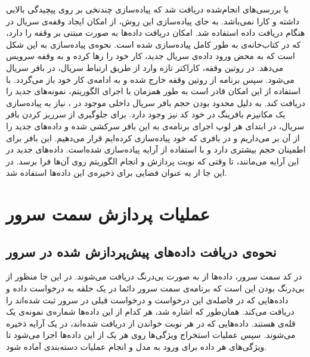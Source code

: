 با بررسی‌های انجام‌شده دریافت شد که پیاده‌سازی چندنخی بر روی  پیچیدگی بالایی داشته و کارا نمی‌باشد. به جای پیاده‌سازی این روش، از امکان ایجاد وقفه‌ی سریال در هنگام دریافت داده استفاده شد.  امکان دریافت داده‌ها به صورت مبتنی بر وقفه را دارد، که در کتاب‌خانه‌ی  به طور کامل پیاده‌سازی شده است. نحوه‌ی پیاده‌سازی به این شکل است که به محض ورود داده‌ی سریال جدید،  کار خود را رها کرده و به وقفه سرویس می‌دهد. در روتین وقفه، کاراکتر تازه وارد از طریق ارتباط سریال، در بافر سریال  می‌شود. سپس برنامه از روتین وقفه خارج شده و به ادامه‌ی کار خود باز می‌گردد. با استفاده از این امکان  قادر است به طور همزمان با اجرای الگوریتم، نمونه‌های جدید را دریافت کند. به دلیل محدود بودن حجم بافر سریال داخلی موجود در ، نیاز به پیاده‌سازی یک مکانیزم بافرینگ در خود کد نیز وجود دارد. برای جلوگیری از سرریز کردن بافر سریال، در ابتدای هر لوپ اجرای برنامه‌ی  به این بافر سرکشی شده و داده‌های جدید را از آن بر می‌داریم و در بافری که خود پیاده‌سازی کرده‌ایم قرار می‌دهیم. این بافر برای اطمینان حجم بیشتری دارد و با استفاده از آرایه پیاده‌سازی شده‌است. داده‌های جدید در این آرایه می‌مانند، تا وقتی که نوبت پردازش و انجام الگوریتم روی آن‌ها فرا برسد. در این جا از  به عنوان فضایی برای ذخیره‌ی این داده‌ها استفاده شد.
	

\section{عملیات پردازش سمت سرور}

	\subsection{نحوه‌ی دریافت داده‌های پیش‌پردازش شده در سرور}
	در کد سمت سرور،‌ داده‌ها از  به صورت بی‌درنگ دریافت می‌شوند. در این جا منظور از بی‌درنگ بودن این است که برنامه‌ی سمت سرور دائما در یک حلقه به  درخواست داده و داده‌هایی که در فاصله‌ی این درخواست و درخواست قبلی در سرور ثبت شده‌اند را دریافت می‌کند. همان‌طور که اشاره شد، هر کدام از این داده‌ها شماره‌ی نمونه‌ی یک قله‌ی  هستند. داده‌هایی که در هر نوبت خواندن از  دریافت شده‌اند، در یک آرایه ذخیره می‌شوند. سپس عملیات استخراج ویژگی‌ها روی هر یک از این داد‌ه‌ها اجرا می‌شود تا ویژگی‌های هر داده برای ورود به مدل  و انجام عملیات دسته‌بندی آماده شود.


